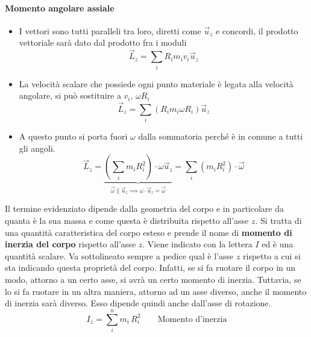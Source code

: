 \documentclass[10pt,a4paper]{book}
\begin{document}
\paragraph{Momento angolare assiale}
\begin{itemize}
	\item I vettori sono tutti paralleli tra loro, diretti come $\vec{u}_z$ e concordi, il prodotto vettoriale sarà dato dal prodotto fra i moduli
	\[
		\vec{L}_z = \sum_i R_i m_i v_i \vec{u}_z
	\]
	\item La velocità scalare che possiede ogni punto materiale è legata alla velocità angolare, si può sostituire a $v_i$, $\omega R_i$
	\[
		\vec{L}_z = \sum_i \left(R_i m_i\omega R_i \right) \vec{u}_z
	\]
	\item A questo punto si porta fuori $\omega$ dalla sommatoria perché è in comune a tutti gli angoli.
	\[
		\vec{L}_z = \underbrace{\left( \sum_i m_i R_i^2 \right) \cdot \omega \vec{u}_z}_{\vec{\omega} \parallel \vec{u}_z \implies \omega \cdot \vec{u}_z = \vec{\omega}} = \sum_i \left( m_i R_i^2  \right) \cdot \vec{\omega}
	\]
\end{itemize}
Il termine evidenziato dipende dalla geometria del corpo e in particolare da quanta è la sua massa e come questa è distribuita rispetto all'asse $z$. Si tratta di una quantità caratteristica del corpo esteso e prende il nome di \textbf{momento di inerzia del corpo} rispetto all'asse $z$. Viene indicato con la lettera $I$ ed è una quantità scalare. Va sottolineato sempre a pedice qual è l'asse $z$ rispetto a cui si sta indicando questa proprietà del corpo. Infatti, se si fa ruotare il corpo in un modo, attorno a un certo asse, si avrà un certo momento di inerzia. Tuttavia, se lo si fa ruotare in un altra maniera, attorno ad un asse diverso, anche il momento di inerzia sarà diverso. Esso dipende quindi anche dall'asse di rotazione.
\[
	\boxed{I_z = \sum_i^n m_i\,R_i^2} \qquad \text{Momento d'inerzia}
\]
\end{document}
